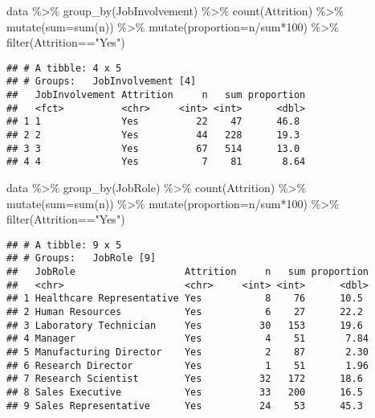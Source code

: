 \documentclass[
]{article}
\newenvironment{Shaded}{\begin{snugshade}}{\end{snugshade}}
\newcommand{\AttributeTok}[1]{\textcolor[rgb]{0.77,0.63,0.00}{#1}}
\newcommand{\DecValTok}[1]{\textcolor[rgb]{0.00,0.00,0.81}{#1}}
\newcommand{\FunctionTok}[1]{\textcolor[rgb]{0.00,0.00,0.00}{#1}}
\newcommand{\NormalTok}[1]{#1}
\newcommand{\SpecialCharTok}[1]{\textcolor[rgb]{0.00,0.00,0.00}{#1}}
\newcommand{\StringTok}[1]{\textcolor[rgb]{0.31,0.60,0.02}{#1}}
\begin{document}
\begin{Shaded}
\begin{Highlighting}[]
\NormalTok{data }\SpecialCharTok{\%\textgreater{}\%} \FunctionTok{group\_by}\NormalTok{(JobInvolvement) }\SpecialCharTok{\%\textgreater{}\%} 
  \FunctionTok{count}\NormalTok{(Attrition) }\SpecialCharTok{\%\textgreater{}\%} 
  \FunctionTok{mutate}\NormalTok{(}\AttributeTok{sum=}\FunctionTok{sum}\NormalTok{(n)) }\SpecialCharTok{\%\textgreater{}\%} 
  \FunctionTok{mutate}\NormalTok{(}\AttributeTok{proportion=}\NormalTok{n}\SpecialCharTok{/}\NormalTok{sum}\SpecialCharTok{*}\DecValTok{100}\NormalTok{) }\SpecialCharTok{\%\textgreater{}\%} 
  \FunctionTok{filter}\NormalTok{(Attrition}\SpecialCharTok{==}\StringTok{"Yes"}\NormalTok{)}
\end{Highlighting}
\end{Shaded}

\begin{verbatim}
## # A tibble: 4 x 5
## # Groups:   JobInvolvement [4]
##   JobInvolvement Attrition     n   sum proportion
##   <fct>          <chr>     <int> <int>      <dbl>
## 1 1              Yes          22    47      46.8 
## 2 2              Yes          44   228      19.3 
## 3 3              Yes          67   514      13.0 
## 4 4              Yes           7    81       8.64
\end{verbatim}

\begin{Shaded}
\begin{Highlighting}[]
\NormalTok{data }\SpecialCharTok{\%\textgreater{}\%} \FunctionTok{group\_by}\NormalTok{(JobRole) }\SpecialCharTok{\%\textgreater{}\%} 
  \FunctionTok{count}\NormalTok{(Attrition) }\SpecialCharTok{\%\textgreater{}\%} 
  \FunctionTok{mutate}\NormalTok{(}\AttributeTok{sum=}\FunctionTok{sum}\NormalTok{(n)) }\SpecialCharTok{\%\textgreater{}\%} 
  \FunctionTok{mutate}\NormalTok{(}\AttributeTok{proportion=}\NormalTok{n}\SpecialCharTok{/}\NormalTok{sum}\SpecialCharTok{*}\DecValTok{100}\NormalTok{) }\SpecialCharTok{\%\textgreater{}\%} 
  \FunctionTok{filter}\NormalTok{(Attrition}\SpecialCharTok{==}\StringTok{"Yes"}\NormalTok{)}
\end{Highlighting}
\end{Shaded}

\begin{verbatim}
## # A tibble: 9 x 5
## # Groups:   JobRole [9]
##   JobRole                   Attrition     n   sum proportion
##   <chr>                     <chr>     <int> <int>      <dbl>
## 1 Healthcare Representative Yes           8    76      10.5 
## 2 Human Resources           Yes           6    27      22.2 
## 3 Laboratory Technician     Yes          30   153      19.6 
## 4 Manager                   Yes           4    51       7.84
## 5 Manufacturing Director    Yes           2    87       2.30
## 6 Research Director         Yes           1    51       1.96
## 7 Research Scientist        Yes          32   172      18.6 
## 8 Sales Executive           Yes          33   200      16.5 
## 9 Sales Representative      Yes          24    53      45.3
\end{verbatim}
\end{document}
